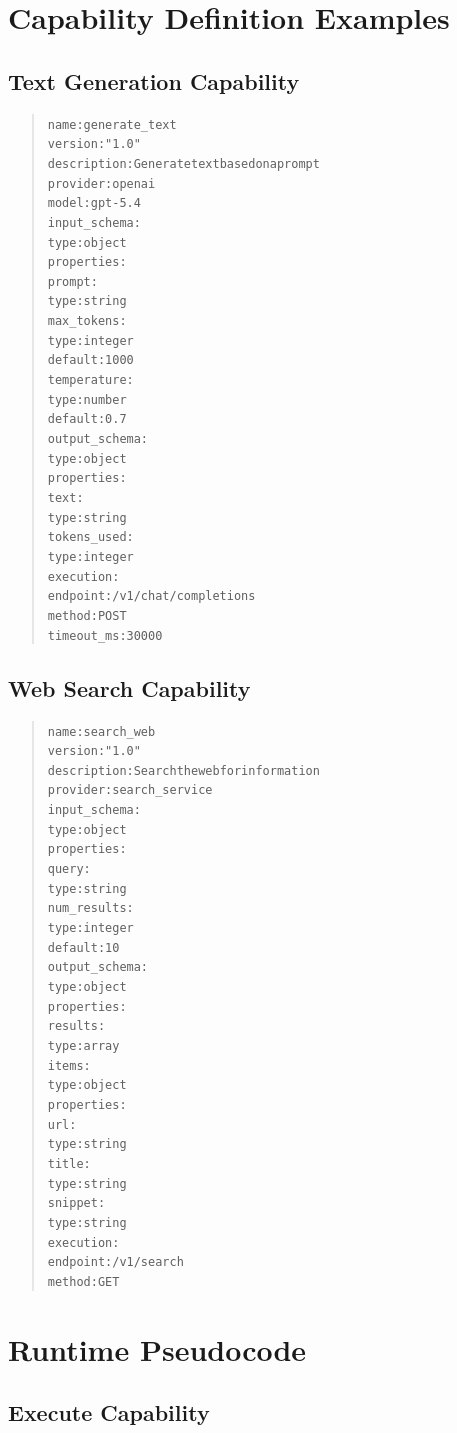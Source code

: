 \section{Capability Definition Examples}

\subsection{Text Generation Capability}

\begin{quote}
\small
\begin{alltt}
name: generate\_text
version: "1.0"
description: Generate text based on a prompt
provider: openai
model: gpt-5.4
input\_schema:
  type: object
  properties:
    prompt:
      type: string
    max\_tokens:
      type: integer
      default: 1000
    temperature:
      type: number
      default: 0.7
output\_schema:
  type: object
  properties:
    text:
      type: string
    tokens\_used:
      type: integer
execution:
  endpoint: /v1/chat/completions
  method: POST
  timeout\_ms: 30000
\end{alltt}
\end{quote}

\subsection{Web Search Capability}

\begin{quote}
\small
\begin{alltt}
name: search\_web
version: "1.0"
description: Search the web for information
provider: search\_service
input\_schema:
  type: object
  properties:
    query:
      type: string
    num\_results:
      type: integer
      default: 10
output\_schema:
  type: object
  properties:
    results:
      type: array
      items:
        type: object
        properties:
          url:
            type: string
          title:
            type: string
          snippet:
            type: string
execution:
  endpoint: /v1/search
  method: GET
\end{alltt}
\end{quote}

\section{Runtime Pseudocode}

\subsection{Execute Capability}

